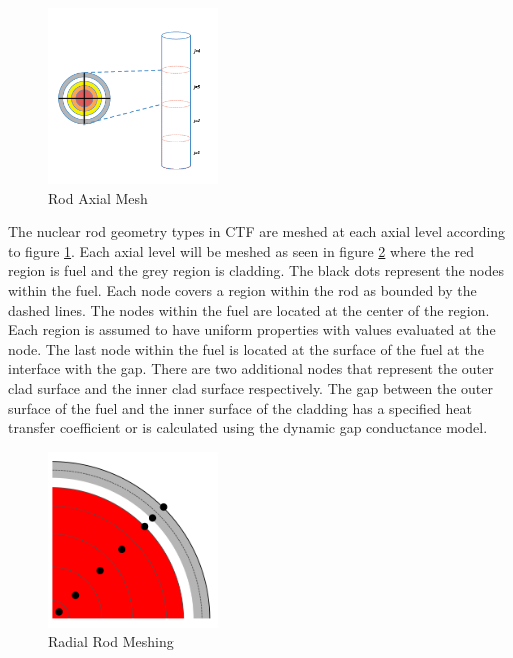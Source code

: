 \begin{figure}[!h]
	\centering
	\includegraphics[width=0.40\textwidth]{images/rod-axial.png}
	\caption{Rod Axial Mesh}
	\label{fig:rod-axial}
\end{figure}

The nuclear rod geometry types in CTF are meshed at each axial level according
to figure \ref{fig:rod-axial}. Each axial level will be meshed as seen in figure
\ref{fig:radial_diagram} where the red region is fuel and the grey region is
cladding. The black dots represent the nodes within the fuel. Each node covers
a region within the rod as bounded by the dashed lines. The nodes within the
fuel are located at the center of the region. Each region is assumed to have
uniform properties with values evaluated at the node. The last node within  the
fuel is located at the surface of the fuel at the interface with the gap. 
There are two additional nodes that represent the outer clad surface and the
inner  clad surface respectively. The gap between the outer surface of the fuel
and the inner surface of the cladding has a specified heat transfer coefficient
or is calculated using the dynamic gap conductance model.

	\begin{figure}[!h]
		\centering
		\includegraphics[width=0.40\textwidth]{images/radial_diagram.png}
		\caption{Radial Rod Meshing}
		\label{fig:radial_diagram}
	\end{figure}
	
